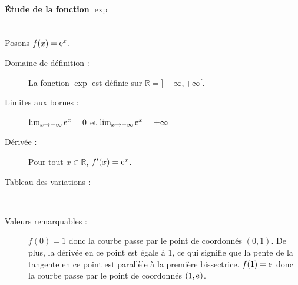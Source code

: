       \paragraph{\'Etude de la fonction $\exp$}~\\
      Posons $f(x) = \mathrm{e}^{x}$.
            \begin{description}
            \item[Domaine de d\'efinition :] La fonction $\exp$ est d\'efinie sur $\mathbb{R} = ]-\infty,+\infty[$.
            \item[Limites aux bornes :] $\lim_{x\rightarrow -\infty} \mathrm{e}^{x} = 0$ et 
                                        $\lim_{x\rightarrow +\infty} \mathrm{e}^{x} = +\infty$
            \item[D\'eriv\'ee :] Pour tout $x\in\mathbb{R}$, $f'(x) = \mathrm{e}^{x}$.
            \item[Tableau des variations :]~\\[-1\baselineskip]
                  \begin{table}[H]
                  \centering
                  \caption{Tableau des variations de la fonction exponentielle.}
                  \label{tab:variations expo}
                  \end{table}
            \item[Valeurs remarquables :] $f(0) = 1$ donc la courbe passe par le point de coordonn\'es $(0,1)$.
                                          De plus, la d\'eriv\'ee en ce point est \'egale \`a $1$,
                                          ce qui signifie que la pente de la tangente en ce point 
                                          est parall\`ele \`a la premi\`ere bissectrice.
                                          $f(1) = \mathrm{e}^{}$ donc la courbe passe par le point de coordonn\'es $(1,\mathrm{e}^{})$. 

\end{description}
